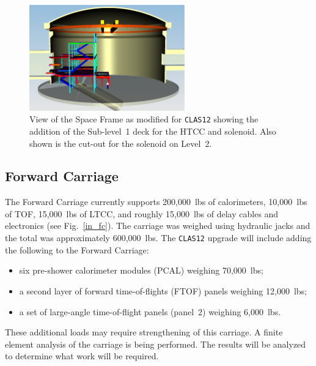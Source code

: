 \begin{figure}[htbp]
\centering
\includegraphics[width=0.6\textwidth]{fig4sf_deck.eps}
\caption{\small{View of the Space Frame as modified for {\tt CLAS12} 
showing the addition of the Sub-level~1 deck for the HTCC and solenoid.
Also shown is the cut-out for the solenoid on Level~2.}}
\label{in_htcc}
\end{figure}

\subsection{Forward Carriage}

The Forward Carriage currently supports 200,000~lbs of calorimeters,
10,000~lbs of TOF, 15,000~lbs of LTCC, and roughly 15,000~lbs of delay 
cables and electronics (see Fig.~\ref{in_fc}).  The carriage was weighed 
using hydraulic jacks and the total was approximately 600,000~lbs. The 
{\tt CLAS12} upgrade will include adding the following to the Forward 
Carriage: 

\begin{itemize}
\item six pre-shower calorimeter modules (PCAL) weighing 70,000~lbs;
\item a second layer of forward time-of-flights (FTOF) panels weighing 
12,000~lbs;
\item a set of large-angle time-of-flight panels (panel~2) weighing 
6,000~lbs.  
\end{itemize}

These additional loads may require strengthening of this carriage.  A 
finite element analysis of the carriage is being performed.  The results 
will be analyzed to determine what work will be required.

